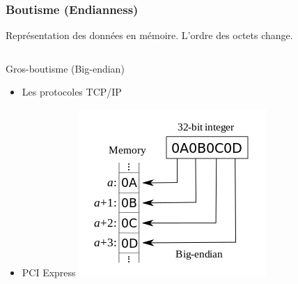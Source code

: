 \documentclass[10pt,xcolor={table,dvipsnames},t]{beamer}
\begin{document}
\begin{frame}
    \frametitle{Boutisme (Endianness)}
    Représentation des données en mémoire. L'ordre des octets change.
    \begin{columns}[T]
        \begin{column}{0.48\textwidth}
            Gros-boutisme (Big-endian)
            \begin{itemize}
                \item Les protocoles TCP/IP 
                \item PCI Express
                \includegraphics[width=.80\textwidth,height=.5\textheight]{Big-Endian}
            \end{itemize}
        \end{column}
        

\end{columns}
\end{frame}
\end{document}
